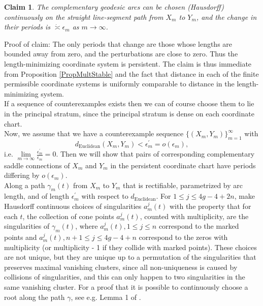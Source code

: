 \documentclass[12pt]{article}
\newtheorem{claim}[theorem]{Claim}
\begin{document}
\begin{claim}
The complementary geodesic arcs can be chosen (Hausdorff) continuously on the straight line-segment path from $X_m$ to $Y_m$, and the change in their periods is $\dot{\asymp}\epsilon_m$ as $m \to \infty$.
\end{claim}

\noindent Proof of claim: The only periods that change are those whose lengths are bounded away from zero, and the perturbations are close to zero. Thus the length-minimizing coordinate system is persistent. The claim is thus immediate from Proposition \ref{PropMultStable} and the fact that distance in each of the finite permissible coordinate systems is uniformly comparable to distance in the length-minimizing system.\\

\noindent If a sequence of counterexamples exists then we can of course choose them to lie in the principal stratum, since the principal stratum is dense on each coordinate chart.\\

\noindent Now, we assume that we have a counterexample sequence $\{(X_m,Y_m)\}_{m = 1}^\infty$ with $$d_\mathrm{Euclidean}(X_m,Y_m) < \epsilon_m^\prime = o(\epsilon_m),$$ i.e. $\lim\limits_{m \to \infty} \frac{\epsilon_m^\prime}{\epsilon_m} = 0$. Then we will show that pairs of corresponding complementary saddle connections of $X_m$ and $Y_m$ in the persistent coordinate chart have periods differing by $o(\epsilon_m)$.\\

\noindent Along a path $\gamma_m(t)$ from $X_m$ to $Y_m$ that is rectifiable, parametrized by arc length, and of length $\epsilon_m^\prime$ with respect to $d_\mathrm{Euclidean}$. For $1 \leq j \leq 4g - 4 + 2n$, make Hausdorff continuous choices of singularities $a_m^j(t)$ with the property that for each $t$, the collection of cone points $a_m^j(t)$, counted with multiplicity, are the singularities of $\gamma_m(t)$, where $a_m^j(t), 1 \leq j \leq n$ correspond to the marked points and $a_m^j(t), n + 1 \leq j \leq 4g - 4 + n$ correspond to the zeros with multiplicity (or multiplicity - 1 if they collide with marked points). These choices are not unique, but they are unique up to a permutation of the singularities that preserves maximal vanishing clusters, since all non-uniqueness is caused by collisions of singularities, and this can only happen to two singularities in the same vanishing cluster. For a proof that it is possible to continuously choose a root along the path $\gamma$, see e.g. Lemma 1 of \cite{PickRoot}.\\
\end{document}
